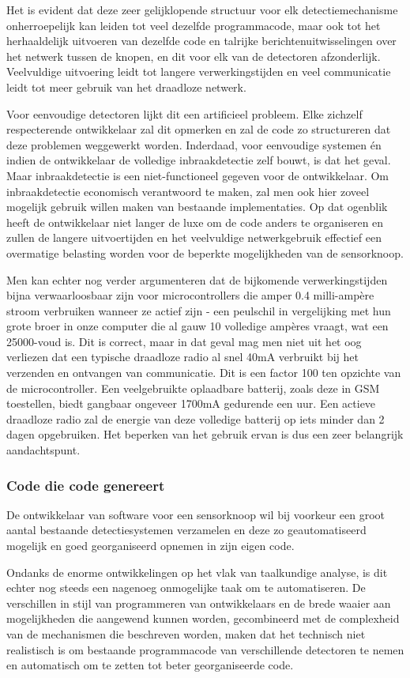 \documentclass[DIV=calc,paper=a4,fontsize=11pt,twocolumn]{scrartcl}
\newcommand{\heading}[1]{
\vspace{-5mm}
\subsubsection*{#1}
\vspace{-2mm}
}
\begin{document}
Het is evident dat deze zeer gelijklopende structuur voor elk
detectiemechanisme onherroepelijk kan leiden tot veel dezelfde programmacode,
maar ook tot het herhaaldelijk uitvoeren van dezelfde code en talrijke
berichtenuitwisselingen over het netwerk tussen de knopen, en dit voor elk van
de detectoren afzonderlijk. Veelvuldige uitvoering leidt tot langere
verwerkingstijden en veel communicatie leidt tot meer gebruik van het draadloze
netwerk.

Voor eenvoudige detectoren lijkt dit een artificieel probleem. Elke zichzelf
respecterende ontwikkelaar zal dit opmerken en zal de code zo structureren dat
deze problemen weggewerkt worden. Inderdaad, voor eenvoudige systemen \'en
indien de ontwikkelaar de volledige inbraakdetectie zelf bouwt, is dat het
geval. Maar inbraakdetectie is een niet-functioneel gegeven voor de
ontwikkelaar. Om inbraakdetectie economisch verantwoord te maken, zal men ook
hier zoveel mogelijk gebruik willen maken van bestaande implementaties. Op dat
ogenblik heeft de ontwikkelaar niet langer de luxe om de code anders te
organiseren en zullen de langere uitvoertijden en het veelvuldige
netwerkgebruik effectief een overmatige belasting worden voor de beperkte
mogelijkheden van de sensorknoop.

Men kan echter nog verder argumenteren dat de bijkomende verwerkingstijden
bijna verwaarloosbaar zijn voor microcontrollers die amper 0.4 milli-amp\`ere
stroom verbruiken wanneer ze actief zijn - een peulschil in vergelijking met
hun grote broer in onze computer die al gauw 10 volledige amp\`eres vraagt, wat
een 25000-voud is. Dit is correct, maar in dat geval mag men niet uit het oog
verliezen dat een typische draadloze radio al snel 40mA verbruikt bij het
verzenden en ontvangen van communicatie. Dit is een factor 100 ten opzichte van
de microcontroller. Een veelgebruikte oplaadbare batterij, zoals deze in GSM
toestellen, biedt gangbaar ongeveer 1700mA gedurende een uur. Een actieve
draadloze radio zal de energie van deze volledige batterij op iets minder dan 2
dagen opgebruiken. Het beperken van het gebruik ervan is dus een zeer
belangrijk aandachtspunt.

\heading{Code die code genereert}

De ontwikkelaar van software voor een sensorknoop wil bij voorkeur een groot
aantal bestaande detectiesystemen verzamelen en deze zo geautomatiseerd
mogelijk en goed georganiseerd opnemen in zijn eigen code.

Ondanks de enorme ontwikkelingen op het vlak van taalkundige analyse, is dit
echter nog steeds een nagenoeg onmogelijke taak om te automatiseren. De
verschillen in stijl van programmeren van ontwikkelaars en de brede waaier aan
mogelijkheden die aangewend kunnen worden, gecombineerd met de complexheid van
de mechanismen die beschreven worden, maken dat het technisch niet realistisch
is om bestaande programmacode van verschillende detectoren te nemen en
automatisch om te zetten tot beter georganiseerde code.
\end{document}
